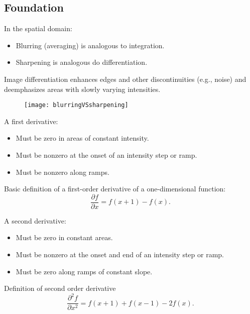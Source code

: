 
\subsection{Foundation}


\begin{frame}
In the spatial domain:
\begin{itemize}
\item Blurring (averaging) is analogous to integration.
\item Sharpening is analogous do differentiation.
\end{itemize}
\begin{block}{}
Image differentiation enhances edges and other discontinuities (e.g., noise) and deemphasizes areas with slowly varying intensities.
\end{block}
\begin{figure}
\centering
\texttt{[image: blurringVSsharpening]}
\end{figure}
\end{frame}


\begin{frame}
A first derivative:
\begin{itemize}
\item Must be zero in areas of constant intensity.
\item Must be nonzero at the onset of an intensity step or ramp.
\item Must be nonzero along ramps. 
\end{itemize}
Basic definition of a first-order derivative of a one-dimensional function:
\begin{equation}
\dfrac{\partial f}{\partial x} = f(x+1) - f(x).
\end{equation}
\end{frame}


\begin{frame}
A second derivative:
\begin{itemize}
\item Must be zero in constant areas.
\item Must be nonzero at the onset and end of an intensity step or ramp.
\item Must be zero along ramps of constant slope.
\end{itemize}
Definition of second order derivative
\begin{equation}
\dfrac{\partial^{2} f}{\partial x^{2}} = f(x+1) + f(x-1) - 2f(x).
\end{equation}
\end{frame}

